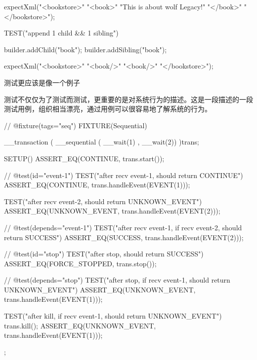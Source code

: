 \begin{content}
\begin{leftbar}
\begin{c++}[caption={\ttfamily{cut/util/XmlNodeSpec.cpp}}]
{{        expectXml("<bookstore>"
                  "<book>"
                  "This is about wolf Legacy!"
                  "</book>"
                  "</bookstore>");
    }

    TEST("append 1 child && 1 sibling")
    {
        builder.addChild("book");
        builder.addSibling("book");

        expectXml("<bookstore>"
                  "<book/>"
                  "<book/>"
                  "</bookstore>");
    }
}
\end{c++}
\end{leftbar}

\begin{regulation}
测试更应该是像一个例子
\end{regulation}

测试不仅仅为了测试而测试，更重要的是对系统行为的描述。这是一段描述的一段测试用例，组织相当漂亮，通过用例可以很容易地了解系统的行为。

\begin{leftbar}
\begin{c++}[caption={\ttfamily{trans-dsl/sched/SequentialSpec.cpp}}]
// @fixture(tags="seq")
FIXTURE(Sequential)
{
   __transaction
   ( __sequential
       ( __wait(1)
       , __wait(2))
   )trans;

   SETUP()
   {
      ASSERT_EQ(CONTINUE, trans.start());
   }

   // @test(id="event-1")
   TEST("after recv event-1, should return CONTINUE")
   {
      ASSERT_EQ(CONTINUE, trans.handleEvent(EVENT(1)));
   }

   TEST("after recv event-2, should return UNKNOWN_EVENT")
   {
      ASSERT_EQ(UNKNOWN_EVENT, trans.handleEvent(EVENT(2)));
   }

   // @test(depends="event-1")
   TEST("after recv event-1, if recv event-2, should return SUCCESS")
   {
      ASSERT_EQ(SUCCESS, trans.handleEvent(EVENT(2)));
   }

   // @test(id="stop")
   TEST("after stop, should return SUCCESS")
   {
      ASSERT_EQ(FORCE_STOPPED, trans.stop());
   }

   // @test(depends="stop")
   TEST("after stop, if recv event-1, should return UNKNOWN_EVENT")
   {
      ASSERT_EQ(UNKNOWN_EVENT, trans.handleEvent(EVENT(1)));
   }

   TEST("after kill, if recv event-1, should return UNKNOWN_EVENT")
   {
      trans.kill();
      ASSERT_EQ(UNKNOWN_EVENT, trans.handleEvent(EVENT(1)));
   }
};
\end{c++}
\end{leftbar}


\end{content}
